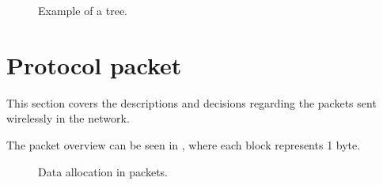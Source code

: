 \begin{figure}[!h]
	\centering
	\caption{Example of a tree.}
	\label{fig:prottree1}
\end{figure}


\section{Protocol packet}
This section covers the descriptions and decisions regarding the packets sent wirelessly in the network.

The packet overview can be seen in , where each block represents 1 byte.
\begin{figure}[h!]
	\centering
	\caption{Data allocation in packets.}
	\label{fig:dataalloc}
\end{figure}


